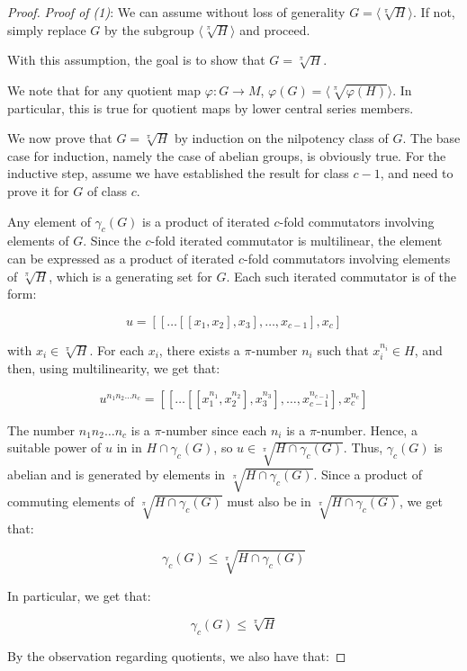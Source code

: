 \documentclass{ucetd}
\begin{document}
\begin{proof}
  {\em Proof of (1)}: We can assume without loss of generality $G = \langle
  \sqrt[\pi]{H} \rangle$. If not, simply replace $G$ by the subgroup
  $\langle \sqrt[\pi]{H} \rangle$ and proceed. 

  With this assumption, the goal is to show that $G = \sqrt[\pi]{H}$.

  We note that for any quotient map $\varphi:G \to M$, $\varphi(G) =
  \langle \sqrt[\pi]{\varphi(H)} \rangle$. In particular, this is true for
  quotient maps by lower central series members.

  We now prove that $G = \sqrt[\pi]{H}$ by induction on the nilpotency
  class of $G$. The base case for induction, namely the case of
  abelian groups, is obviously true. For the inductive step, assume we
  have established the result for class $c - 1$, and need to prove it
  for $G$ of class $c$.

  Any element of $\gamma_c(G)$ is a product of iterated $c$-fold
  commutators involving elements of $G$. Since the $c$-fold iterated
  commutator is multilinear, the element can be expressed as a product
  of iterated $c$-fold commutators involving elements of
  $\sqrt[\pi]{H}$, which is a generating set for $G$. Each such
  iterated commutator is of the form:

  $$u = [[\dots[[x_1,x_2],x_3],\dots,x_{c-1}],x_c]$$

  with $x_i \in \sqrt[\pi]{H}$. For each $x_i$, there exists a
  $\pi$-number $n_i$ such that $x_i^{n_i} \in H$, and then, using
  multilinearity, we get that:

  $$u^{n_1n_2 \dots n_c} = [[\dots[[x_1^{n_1},x_2^{n_2}],x_3^{n_3}],\dots,x_{c-1}^{n_{c-1}}],x_c^{n_c}]$$

  The number $n_1n_2 \dots n_c$ is a $\pi$-number since each $n_i$ is
  a $\pi$-number. Hence, a suitable power of $u$ in in $H \cap
  \gamma_c(G)$, so $u \in \sqrt[\pi]{H \cap \gamma_c(G)}$. Thus,
  $\gamma_c(G)$ is abelian and is generated by elements in
  $\sqrt[\pi]{H \cap \gamma_c(G)}$. Since a product of commuting
  elements of $\sqrt[\pi]{H \cap \gamma_c(G)}$ must also be in
  $\sqrt[\pi]{H \cap \gamma_c(G)}$, we get that:

  $$\gamma_c(G) \le \sqrt[\pi]{H \cap \gamma_c(G)}$$

  In particular, we get that:

  $$\gamma_c(G) \le \sqrt[\pi]{H}$$

  By the observation regarding quotients, we also have that:


\end{proof}
\end{document}
